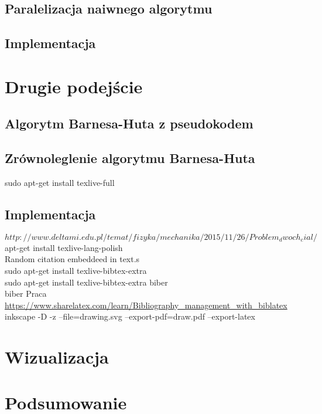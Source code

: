 \documentclass[14pt,twoside,a4paper]{article}
\begin{document}
\subsection{\Large Paralelizacja naiwnego algorytmu}

\bigskip
\subsection{\Large Implementacja}

\bigskip

\section{\LARGE Drugie podejście}

\bigskip

\subsection{\Large Algorytm Barnesa-Huta z pseudokodem}

\bigskip

\subsection{\Large Zrównoleglenie algorytmu Barnesa-Huta}

\bigskip
 sudo apt-get install texlive-full

\subsection{\Large Implementacja}

$http://www.deltami.edu.pl/temat/fizyka/mechanika/2015/11/26/Problem_dwoch_cial/$
\bigskip
apt-get install texlive-lang-polish\\
Random citation embeddeed in text.s\\
 sudo apt-get install texlive-bibtex-extra\\
 sudo apt-get install texlive-bibtex-extra biber\\
biber Praca\\
\url{https://www.sharelatex.com/learn/Bibliography_management_with_biblatex}\\
inkscape -D -z --file=drawing.svg --export-pdf=draw.pdf --export-latex

\section{\LARGE Wizualizacja}

\newpage

\section{\LARGE Podsumowanie}

\newpage

\nocite{*}
\printbibliography
\end{document}
